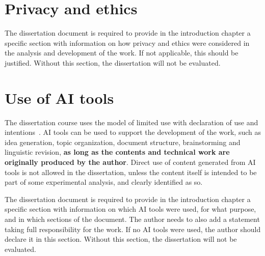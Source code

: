 \section{Privacy and ethics}
The dissertation document is required to provide in the introduction chapter a specific section with information on how privacy and ethics were considered in the analysis and development of the work. If not applicable, this should be justified. Without this section, the dissertation will not be evaluated.


\section{Use of AI tools}
The dissertation course uses the model of limited use with declaration of use and intentions~\parencite{oliveira2025}. AI tools can be used to support the development of the work, such as idea generation, topic organization, document structure, brainstorming and linguistic revision, \textbf{as long as the contents and technical work are originally produced by the author}. Direct use of content generated from AI tools is not allowed in the dissertation, unless the content itself is intended to be part of some experimental analysis, and clearly identified as so. 

The dissertation document is required to provide in the introduction chapter a specific section with information on which AI tools were used, for what purpose, and in which sections of the document. The author needs to also add a statement taking full responsibility for the work. If no AI tools were used, the author should declare it in this section. Without this section, the dissertation will not be evaluated.



